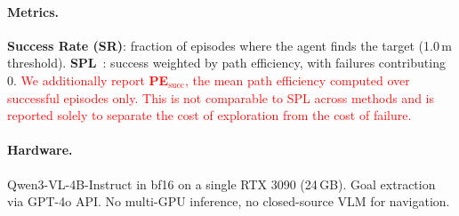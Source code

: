 \paragraph{Metrics.} \textbf{Success Rate (SR)}: fraction of episodes where the agent finds the target (1.0\,m threshold). \textbf{SPL}~\cite{anderson2018spl}: success weighted by path efficiency, with failures contributing 0. \textcolor{red}{We additionally report \textbf{PE}$_{\text{succ}}$, the mean path efficiency computed over successful episodes only. This is not comparable to SPL across methods and is reported solely to separate the cost of exploration from the cost of failure.}

\paragraph{Hardware.} Qwen3-VL-4B-Instruct in bf16 on a single RTX 3090 (24\,GB). Goal extraction via GPT-4o API. No multi-GPU inference, no closed-source VLM for navigation.

\textcolor{red}{
\begin{table}[H]
\centering
\caption{\textcolor{red}{\textbf{Evaluation set statistics by landmark count $m$.} Columns partition the 345 episodes by how many landmarks the instruction names; the final column aggregates all of them. The first row establishes that each bucket is large enough to support a claim. The second row is a confound check: if mean geodesic distance were to grow sharply with $m$, any effect of landmark count would be indistinguishable from an effect of episode length. The third row links $m$ to the mechanism, since each landmark is an opportunity for the CORRECT phase to fire.}}
\label{tab:stats}
\vspace{1mm}
\end{table}
}

